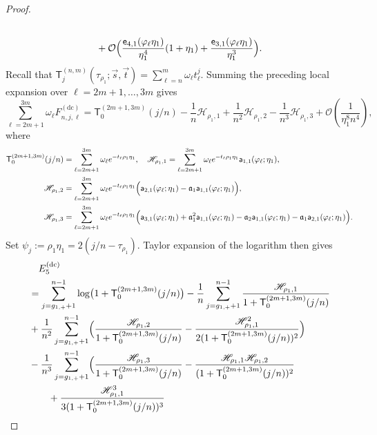 \documentclass[a4paper]{article}
\numberwithin{equation}{section}
\begin{document}
\begin{proof}
\begin{align*}
\\
&\quad 
+
\mathcal{O}\Bigl( 
\frac{\mathsf{e}_{4,1}(\varphi_{\ell}\eta_1)}{\eta_1^4}(1+\eta_1)
+
\frac{\mathsf{e}_{3,1}(\varphi_{\ell}\eta_1)}{\eta_1^3}
\Bigr). 
\end{align*}
Recall that $\mathsf{T}_{j}^{(n,m)}(\tau_{\rho_1};\vec{s},\vec{t})
=\sum_{\ell=n}^{m}\omega_{\ell}t_{\ell}^j$.  Summing the preceding local
expansion over $\ell=2m+1,\ldots,3m$ gives
\[
\sum_{\ell={2m+1}}^{3m}\omega_{\ell}F_{n,j,\ell}^{(\mathrm{dc})}
=
\mathsf{T}_{0}^{(2m+1,3m)}(j/n)
-\frac{1}{n}\mathscr{H}_{\rho_1,1}
+\frac{1}{n^2}\mathscr{H}_{\rho_1,2}
-\frac{1}{n^3}\mathscr{H}_{\rho_1,3}
+\mathcal{O}(\frac{1}{\eta_1^8n^4}), 
\]
where 
\begin{align*}
\mathsf{T}_{0}^{(2m+1,3m)}(j/n)
&=
\sum_{\ell={2m+1}}^{3m}\omega_{\ell}
e^{-t_{\ell}\rho_1\eta_1}, 
\quad
\mathscr{H}_{\rho_1,1}
=
\sum_{\ell={2m+1}}^{3m}\omega_{\ell}
e^{-t_{\ell}\rho_1\eta_1}\mathsf{a}_{1,1}(\varphi_{\ell};\eta_1), 
\\
\mathscr{H}_{\rho_1,2}
&=
\sum_{\ell={2m+1}}^{3m}\omega_{\ell}
e^{-t_{\ell}\rho_1\eta_1}\Bigl(
\mathsf{a}_{2,1}(\varphi_{\ell};\eta_1)
-\mathfrak{a}_1\mathsf{a}_{1,1}(\varphi_{\ell};\eta_1)
\Bigr), 
\\
\mathscr{H}_{\rho_1,3}
&=
\sum_{\ell={2m+1}}^{3m}\omega_{\ell}
e^{-t_{\ell}\rho_1\eta_1}
\Bigl(\mathsf{a}_{3,1}(\varphi_{\ell};\eta_1)
+
\mathfrak{a}_1^2\mathsf{a}_{1,1}(\varphi_{\ell};\eta_1)
-
\mathfrak{a}_2\mathsf{a}_{1,1}(\varphi_{\ell};\eta_1)
-
\mathfrak{a}_1\mathsf{a}_{2,1}(\varphi_{\ell};\eta_1)
\Bigr). 
\end{align*}
Set $\psi_j:=\rho_1\eta_1=2(j/n-\tau_{\rho_1})$.  Taylor expansion of the
logarithm then gives
\begin{align*}
&\quad E_5^{(\mathrm{dc})}\\
&=  
\sum_{j=g_{1,+}+1}^{n-1}
\log\bigl(1+\mathsf{T}_{0}^{(2m+1,3m)}(j/n)\bigr)
-\frac{1}{n}
\sum_{j=g_{1,+}+1}^{n-1}
\frac{\mathscr{H}_{\rho_1,1}}{1+\mathsf{T}_{0}^{(2m+1,3m)}(j/n)}
\\
&
+\frac{1}{n^2}\sum_{j=g_{1,+}+1}^{n-1}\Bigl( 
\frac{\mathscr{H}_{\rho_1,2}}{1+\mathsf{T}_{0}^{(2m+1,3m)}(j/n)}-\frac{\mathscr{H}_{\rho_1,1}^2}{2(1+\mathsf{T}_{0}^{(2m+1,3m)}(j/n))^2}
\Bigr)
\\
&
-\frac{1}{n^3}
\sum_{j=g_{1,+}+1}^{n-1}
\Bigl( 
\frac{\mathscr{H}_{\rho_1,3}}{1+\mathsf{T}_{0}^{(2m+1,3m)}(j/n)}
-\frac{\mathscr{H}_{\rho_1,1}\mathscr{H}_{\rho_1,2}}{(1+\mathsf{T}_{0}^{(2m+1,3m)}(j/n))^2}
\\
&\qquad+\frac{\mathscr{H}_{\rho_1,1}^3}{3(1+\mathsf{T}_{0}^{(2m+1,3m)}(j/n))^3}

\end{align*}
\end{proof}
\end{document}

